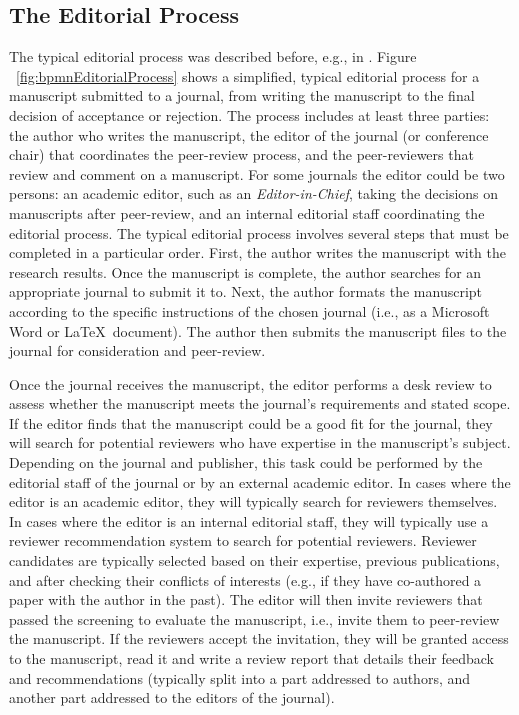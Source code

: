 \subsection{The Editorial Process}

The typical editorial process was described before, e.g., in \citet{faggionImprovingPeerreviewProcess2016}. Figure ~\ref{fig:bpmnEditorialProcess}
shows a simplified, typical editorial process for a manuscript submitted to a journal, from writing the manuscript to the final decision of acceptance
or rejection. The process includes at least three parties: the author who
writes the manuscript, the editor of the journal (or conference chair) that coordinates the peer-review process, and the peer-reviewers
that review and comment on a manuscript. For some journals the editor could be two persons: an academic editor, such as an \textit{Editor-in-Chief},
taking the decisions on manuscripts after peer-review, and an internal editorial staff coordinating the editorial process.
The typical editorial process involves several steps that must be completed in a particular order. First, the author writes the manuscript
with the research results. Once the manuscript is complete, the author searches for an appropriate journal to submit it to. Next, the author
formats the manuscript according to the specific instructions of the chosen journal (i.e., as a Microsoft Word or \LaTeX~document). The author
then submits the manuscript files to the journal for consideration and peer-review. 

Once the journal receives the manuscript, the editor performs a desk review to assess whether the manuscript meets the journal's requirements
and stated scope. If the editor finds that the manuscript could be a good fit for the journal, they will search for potential reviewers who
have expertise in the manuscript's subject. Depending on the journal and publisher, this task could be performed by the editorial staff of
the journal or by an external academic editor. In cases where the editor is an academic editor, they will typically search for reviewers
themselves. In cases where the editor is an internal editorial staff, they will typically use a reviewer recommendation system to search
for potential reviewers. Reviewer candidates are typically selected based on their expertise, previous publications, and after checking 
their conflicts of interests (e.g., if they have co-authored a paper with the author in the past). The editor will then invite reviewers
that passed the screening to evaluate the manuscript, i.e., invite them to peer-review the manuscript. If the reviewers accept the invitation,
they will be granted access to the manuscript, read it and write a review report that details their feedback and recommendations (typically
split into a part addressed to authors, and another part addressed to the editors of the journal). 

